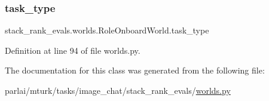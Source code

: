 \subsubsection{\texorpdfstring{task\+\_\+type}{task\_type}}
{\footnotesize\ttfamily stack\+\_\+rank\+\_\+evals.\+worlds.\+Role\+Onboard\+World.\+task\+\_\+type}



Definition at line 94 of file worlds.\+py.



The documentation for this class was generated from the following file\+:\begin{DoxyCompactItemize}
\item 
parlai/mturk/tasks/image\+\_\+chat/stack\+\_\+rank\+\_\+evals/\hyperlink{parlai_2mturk_2tasks_2image__chat_2stack__rank__evals_2worlds_8py}{worlds.\+py}\end{DoxyCompactItemize}
